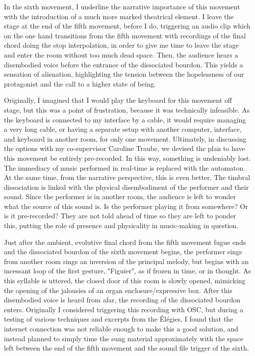 \documentclass[12pt,twoside,maitrise]{dms_ks}
\theoremstyle{definition}
\begin{document}
{In the sixth movement, I underline the narrative importance of this movement with the introduction of a much more marked theatrical element.
I leave the stage at the end of the fifth movement, before I do, triggering an audio clip which on the one hand transitions from the fifth movement with recordings of the final chord doing the stop interpolation, in order to give me time to leave the stage and enter the room without too much dead space.
Then, the audience hears a disembodied voice before the entrance of the dissociated bourdon.
This yields a sensation of alienation, highlighting the tension between the hopelessness of our protagonist and the call to a higher state of being.

Originally, I imagined that I would play the keyboard for this movement off stage, but this was a point of frustration, because it was technically infeasible.
As the keyboard is connected to my interface by a cable, it would require managing a very long cable, or having a separate setup with another computer, interface, and keyboard in another room, for only one movement.
Ultimately, in discussing the options with my co-supervisor Caroline Traube, we devised the plan to have this movement be entirely pre-recorded.
In this way, something is undeniably lost.
The immediacy of music performed in real-time is replaced with the automaton.
At the same time, from the narrative perspective, this is even better.
The timbral dissociation is linked with the physical disembodiment of the performer and their sound.
Since the performer is in another room, the audience is left to wonder what the source of this sound is.
Is the performer playing it from somewhere?
Or is it pre-recorded?
They are not told ahead of time so they are left to ponder this, putting the role of presence and physicality in music-making in question.

Just after the ambient, evolutive final chord from the fifth movement fugue ends and the dissociated bourdon of the sixth movement begins, the performer sings from another room sings an inversion of the principal melody, but begins with an incessant loop of the first gesture, "Figuier", as if frozen in time, or in thought.
As this syllable is uttered, the closed door of this room is slowly opened, mimicking the opening of the jalousies of an organ enclosure/expressive box.
After this disembodied voice is heard from afar, the recording of the dissociated bourdon enters.
Originally I considered triggering this recording with OSC, but during a testing of various techniques and excerpts from the Élégies, I found that the internet connection was not reliable enough to make this a good solution, and instead planned to simply time the sung material approximately with the space left between the end of the fifth movement and the sound file trigger of the sixth.

}
\end{document}
